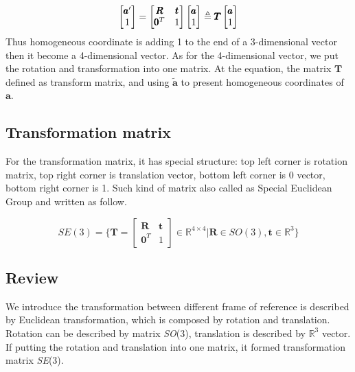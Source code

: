 \begin{equation}
    \begin{bmatrix} 
        \pmb{a}' \\
        1
    \end{bmatrix}=
    \begin{bmatrix}
        \pmb{R} & \pmb{t}\\
        \pmb{0}^T & 1
    \end{bmatrix}
    \begin{bmatrix}
        \pmb{a}\\
        1
    \end{bmatrix}
    \triangleq
    \pmb{T}\\
    \begin{bmatrix}
        \pmb{a}\\
        1
    \end{bmatrix}
\end{equation}
Thus homogeneous coordinate is adding 1 to the end of a 3-dimensional vector then it become a 4-dimensional vector. As for the 4-dimensional vector, we put the rotation and transformation into one matrix. At the equation, the matrix $\pmb{T}$ defined as transform matrix, and using $\pmb{\tilde{a}}$ to present homogeneous coordinates of $\pmb{a}$.

\subsection{Transformation matrix}

For the transformation matrix, it has special structure: top left corner is rotation matrix, top right corner is translation vector, bottom left corner is 0 vector, bottom right corner is 1. Such kind of matrix also called as Special Euclidean Group and written as follow.

\begin{equation}
    SE(3)=\{\pmb{T} = 
    \begin{bmatrix} 
        \pmb{R} & \pmb{t}\\
        \pmb{0}^T & 1
    \end{bmatrix} \in \mathbb{R}^{4\times4}|\pmb{R} \in SO(3),\pmb{t}
    \in \mathbb{R}^3\}
\end{equation}

\subsection{Review}

We introduce the transformation between different frame of reference is described by Euclidean transformation, which is composed by rotation and translation. Rotation can be described by matrix \emph{SO}(3), translation is described by $\mathbb{R}^3$ vector. If putting the rotation and translation into one matrix, it formed transformation matrix \emph{SE}(3).